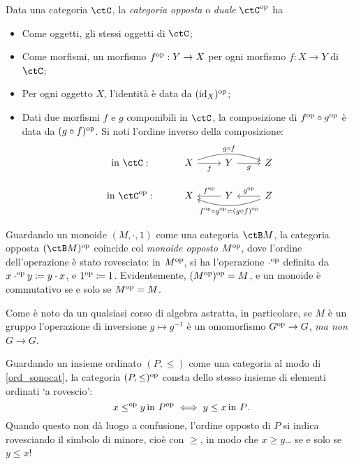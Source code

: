 \begin{definition}\label{def_cat_opp}
	Data una categoria \(\ctC\), la \emph{categoria opposta} o \emph{duale} \(\ctC^\op\) ha
	\begin{itemize}
		\item Come oggetti, gli stessi oggetti di \(\ctC\);
		\item Come morfismi, un morfismo \(f^{\text{op}}:Y\to X\) per ogni morfismo \(f:X\to Y\) di \(\ctC\);
		\item Per ogni oggetto \(X\), l'identità è data da \((\mathrm{id}_X)^{\text{op}}\);
		\item Dati due morfismi \(f\) e \(g\) componibili in \(\ctC\), la composizione di \(f^{\text{op}}\circ g^{\text{op}}\) è data da \((g\circ f)^{\text{op}}\). Si noti l'ordine inverso della composizione:
		      \[
			      \begin{tikzcd}
				      \text{in }\ctC: & X \ar{r}[swap]{f} \ar[bend left=20]{rr}{g\cmp f} & Y \ar{r}[swap]{g} & Z \\
				      \text{in }\ctC^\op: &X & Y  \ar{l}[swap]{f^\op} & Z \ar{l}[swap]{g^\op} \ar[bend left=20]{ll}{f^\op\cmp g^\op=(g\cmp f)^\op}
			      \end{tikzcd}
		      \]
	\end{itemize}
\end{definition}
\begin{example}
	Guardando un monoide $(M,\cdot,1)$ come una categoria $\ctB M$, la categoria opposta $(\ctB M)^\op$ coincide col \emph{monoide opposto} $M^{\text{op}}$, dove l'ordine dell'operazione è stato rovesciato: in $M^{\text{op}}$, si ha l'operazione $\cdot^{\text{op}}$ definita da $x\cdot^{\text{op}} y \coloneqq y\cdot x$, e $1^{\text{op}} \coloneqq 1$. Evidentemente, $(M^{\text{op}})^{\text{op}} = M$, e un monoide è commutativo se e solo se $M^{\text{op}}=M$.

	Come è noto da un qualsiasi corso di algebra astratta, in particolare, se $M$ è un gruppo l'operazione di inversione $g\mapsto g^{-1}$ è un omomorfismo $G^{\text{op}}\to G$, \emph{ma non} $G\to G$.
\end{example}
\begin{example}
	Guardando un insieme ordinato $(P,\le)$ come una categoria al modo di \ref{ord_sonocat}, la categoria $(P,\le)^{\text{op}}$ consta dello stesso insieme di elementi ordinati `a rovescio':
	\[x\le^{\text{op}} y \, \text{in $P^{\text{op}}$}\iff y\le x\, \text{in $P$}.\]
	Quando questo non dà luogo a confusione, l'ordine opposto di $P$ si indica rovesciando il simbolo di minore, cioè con $\ge$, in modo che $x\ge y$\dots{} se e solo se $y\le x$!
\end{example}
